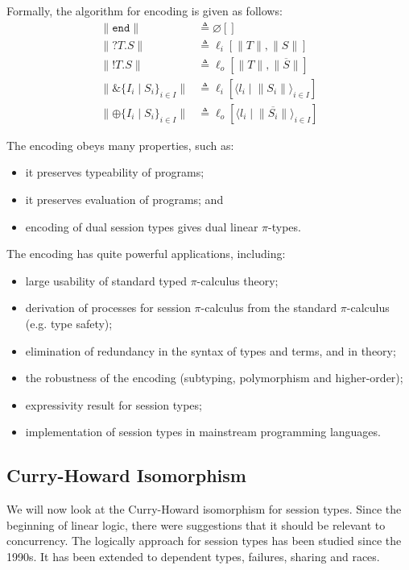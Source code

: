 \documentclass[a4paper, openany]{memoir}
\theoremstyle{definition}
\begin{document}
    Formally, the algorithm for encoding is given as follows:
    \begin{align*}
        \lVert \texttt{end} \rVert &\triangleq \varnothing[] \\
        \lVert ?T.S \rVert &\triangleq \ell_i[\lVert T \rVert, \lVert S\rVert] \\
        \lVert !T.S \rVert &\triangleq \ell_o[\lVert T\rVert, \lVert\overline{S}\rVert] \\
        \lVert \& \{I_i \mid S_i\}_{i \in I} \rVert &\triangleq \ell_i[\langle l_i \mid \lVert S_i \rVert \rangle_{i \in I}] \\
        \lVert \oplus \{I_i \mid S_i\}_{i \in I} \rVert &\triangleq \ell_o[\langle l_i \mid \lVert \overline{S_i}\rVert \rangle_{i \in I}]
    \end{align*}
    
    The encoding obeys many properties, such as:
    \begin{itemize}
        \item it preserves typeability of programs;
        \item it preserves evaluation of programs; and
        \item encoding of dual session types gives dual linear $\pi$-types.
    \end{itemize}

    The encoding has quite powerful applications, including:
    \begin{itemize}
        \item large usability of standard typed $\pi$-calculus theory;
        \item derivation of processes for session $\pi$-calculus from the standard $\pi$-calculus (e.g. type safety);
        \item elimination of redundancy in the syntax of types and terms, and in theory;
        \item the robustness of the encoding (subtyping, polymorphism and higher-order);
        \item expressivity result for session types;
        \item implementation of session types in mainstream programming languages.
    \end{itemize}

    \subsection{Curry-Howard Isomorphism}
    We will now look at the Curry-Howard isomorphism for session types. Since the beginning of linear logic, there were suggestions that it should be relevant to concurrency. The logically approach for session types has been studied since the 1990s. It has been extended to dependent types, failures, sharing and races.
\end{document}
